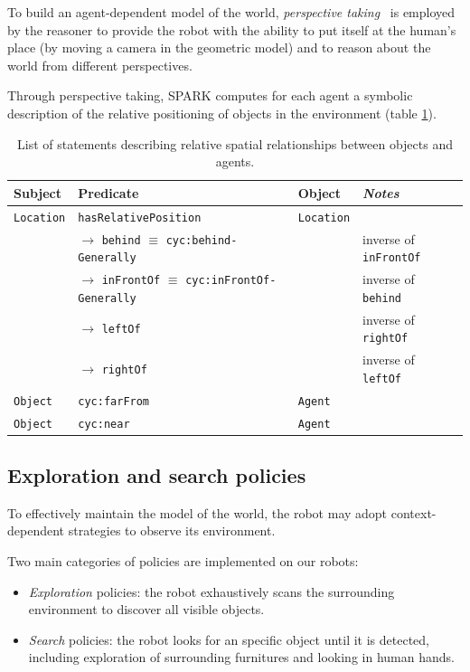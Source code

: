 \documentclass{svmult}
\newcommand{\concept}[1]{{\footnotesize \texttt{#1}}}
\begin{document}
To build an agent-dependent model of the world, \emph{perspective
taking}~\cite{Flavell1992,Tversky1999} is employed by the reasoner to provide
the robot with the ability to put itself at the human's place (by moving a
camera in the geometric model) and to reason about the world from different
perspectives.


Through perspective taking, SPARK computes for each agent a symbolic
description of the relative positioning of objects in the environment (table
\ref{facts|relative}).

\begin{table}[h]
	\centering
	    \begin{tabular}{p{1.5cm}p{6cm}p{1.5cm}l}
		\rowcolor{white}
		\textbf{Subject} & \textbf{Predicate} & \textbf{Object} & \emph{Notes} \\
		\hline
	 \concept{Location}  & \concept{hasRelativePosition}  & \concept{Location} & \\ 
	 & 	$\rightarrow$ \concept{behind} $\equiv$ \concept{cyc:behind-Generally}  &  & inverse of \concept{inFrontOf}  \\ 
	 &  $\rightarrow$ \concept{inFrontOf} $\equiv$ \concept{cyc:inFrontOf-Generally}  & 	 & 	 inverse of \concept{behind}  \\ 
	 &  $\rightarrow$ \concept{leftOf}  &  &  inverse of \concept{rightOf} \\ 
	 &  $\rightarrow$ \concept{rightOf}  & 	 & 	 inverse of \concept{leftOf}  \\ 
	 \concept{Object}  & \concept{cyc:farFrom}  &  \concept{Agent} & \\ 
	 \concept{Object}  & \concept{cyc:near}  &  \concept{Agent} & 
	\end{tabular}
	\caption{List of statements describing relative spatial relationships between objects and agents.}
	\label{facts|relative}
\end{table}


\subsection{Exploration and search policies}

To effectively maintain the model of the world, the robot may adopt
context-dependent strategies to observe its environment.

Two main categories of policies are implemented on our robots:

\begin {itemize}

	\item \emph{Exploration} policies: the robot exhaustively scans the
	surrounding environment to discover all visible objects.

	\item \emph{Search} policies: the robot looks for an specific object until
	it is detected, including exploration of surrounding furnitures and looking in
	human hands.

\end {itemize}
\end{document}
